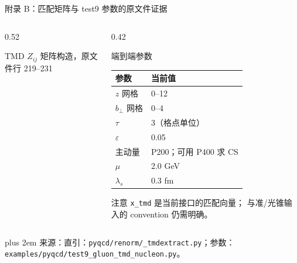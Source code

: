 \documentclass[UTF8,aspectratio=169,11pt]{ctexbeamer}
\renewcommand{\arraystretch}{0.92}
\newcommand{\source}[1]{%
  \par\vspace{0.02em}\begingroup\fontsize{6}{6.8}\selectfont\raggedright\sloppy
  \setlength{\emergencystretch}{3em}\rightskip=0pt plus 2em
  \color{muted}来源：#1\par\endgroup}
\begin{document}
\begin{frame}[t]{附录 B：匹配矩阵与 test9 参数的原文件证据}
  \footnotesize
  \begin{columns}[T,totalwidth=\textwidth]
    \begin{column}{0.52\textwidth}
      \begin{block}{TMD \(Z_{ij}\) 矩阵构造，原文件行 219--231}
        
      \end{block}
    \end{column}
    \begin{column}{0.42\textwidth}
      \begin{block}{端到端参数}
        \scriptsize
        \renewcommand{\arraystretch}{0.78}
        \begin{tabular}{@{}ll@{}}
          \toprule
          参数 & 当前值\\
          \midrule
          \(z\) 网格 & 0--12\\
          \(b_\perp\) 网格 & 0--4\\
          \(\tau\) & 3（格点单位）\\
          \(\varepsilon\) & 0.05\\
          主动量 & P200；可用 P400 求 CS\\
          \(\mu\) & 2.0 GeV\\
          \(\lambda_s\) & 0.3 fm\\
          \bottomrule
        \end{tabular}
      \end{block}
      \begin{block}{注意}
        \scriptsize\texttt{x\_tmd} 是当前接口的匹配向量；
        与准/光锥输入的 convention 仍需明确。
      \end{block}
    \end{column}
  \end{columns}
  \source{直引：\nolinkurl{pyqcd/renorm/_tmdextract.py}；参数：\nolinkurl{examples/pyqcd/test9_gluon_tmd_nucleon.py}。}
\end{frame}
\end{document}
